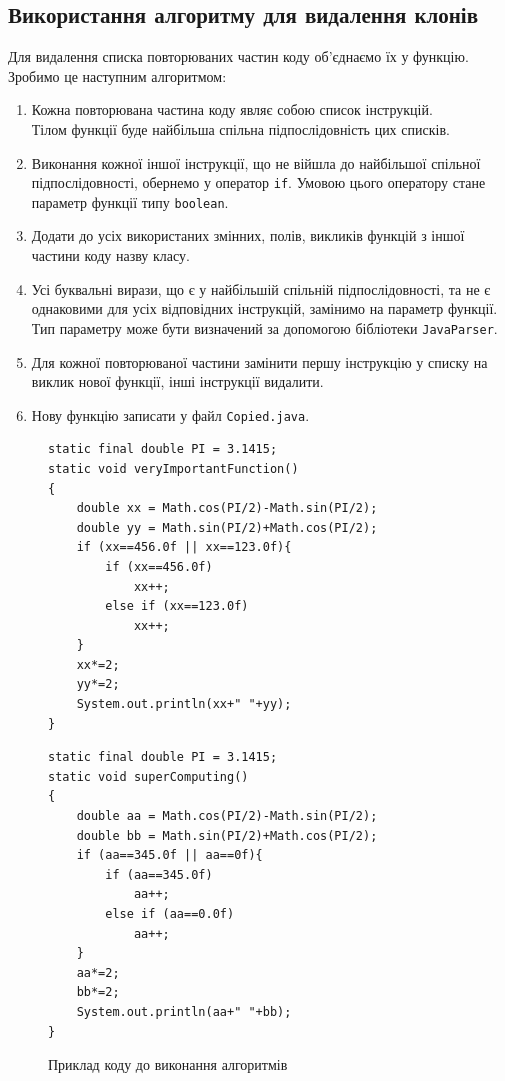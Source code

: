 \documentclass[a4paper, 14pt]{article}
\begin{document}
\subsection{Використання алгоритму для видалення клонів}
Для видалення списка повторюваних частин коду об'єднаємо їх у функцію. \\
Зробимо це наступним алгоритмом: 
\begin{enumerate}
\item Кожна повторювана частина коду являє собою список інструкцій. \\
Тілом функції буде найбільша спільна підпослідовність цих списків.
\item Виконання кожної іншої інструкції, що не війшла до найбільшої спільної підпослідовності, обернемо у оператор \verb|if|.
Умовою цього оператору стане параметр функції типу \verb|boolean|.
\item Додати до усіх використаних змінних, полів, викликів функцій з іншої частини коду назву класу.
\item Усі буквальні вирази, що є у найбільшій спільній підпослідовності, та не є однаковими для усіх відповідних інструкцій, замінимо на параметр функції. Тип параметру може бути визначений за допомогою бібліотеки \verb|JavaParser|.
\item Для кожної повторюваної частини замінити першу інструкцію у списку на виклик нової функції, інші інструкції видалити.
\item Нову функцію записати у файл \verb|Copied.java|.
\end{enumerate}
\begin{figure}[h!]
\centering
\begin{minipage}{.45\textwidth}
\begin{lstlisting}[frame=none]
static final double PI = 3.1415;
static void veryImportantFunction()
{
	double xx = Math.cos(PI/2)-Math.sin(PI/2);
	double yy = Math.sin(PI/2)+Math.cos(PI/2);
	if (xx==456.0f || xx==123.0f){
		if (xx==456.0f)
			xx++;
		else if (xx==123.0f)
			xx++;
	}
	xx*=2;
	yy*=2;
	System.out.println(xx+" "+yy);
}
\end{lstlisting}
\end{minipage}
\begin{minipage}{.45\textwidth}
\begin{lstlisting}[frame=none]
static final double PI = 3.1415;
static void superComputing()
{
	double aa = Math.cos(PI/2)-Math.sin(PI/2);
	double bb = Math.sin(PI/2)+Math.cos(PI/2);
	if (aa==345.0f || aa==0f){
		if (aa==345.0f)
			aa++;
		else if (aa==0.0f)
			aa++;
	}
	aa*=2;
	bb*=2;
	System.out.println(aa+" "+bb);
}
\end{lstlisting}
\end{minipage}
\caption*{Приклад коду до виконання алгоритмів}
\end{figure}
\end{document}
